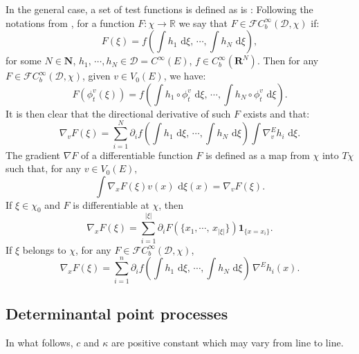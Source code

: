 \documentclass[11pt,a4paper]{amsart}
\begin{document}
In the general case, a set of test functions is defined as is :
Following the notations from \cite{MR99d:58179}, for a function
$F:\chi\rightarrow \mathbb{R}$ we say that $F \in
\mathcal{F}C^{\infty}_b(\mathcal{D},\chi)$ if:
\begin{equation*}
   F(\xi)=f\left(\int h_1 {\text{ d}}\xi,\, \cdots, \int h_N{\text{ d}}\xi  \right),
\end{equation*}
for some $N \in {{\mathbf N}}$, $h_1,\, \cdots,h_N \in
\mathcal{D}=C^{\infty}(E)$, $f \in C^{\infty}_b({{\mathbf R}}^N)$.  Then for any
$F \in \mathcal{F}C^{\infty}_b(\mathcal{D},\chi)$, given $v \in
V_0(E)$, we have:
\begin{equation*}
  F(\phi_t^v(\xi))=f\left(\int h_1 \circ \phi_t^v{\text{ d}}\xi,\, \cdots, \int h_N \circ \phi_t^v{\text{ d}}\xi\right).
\end{equation*}
It is then clear that the directional derivative of such $F$ exists
and that:
\begin{equation*}
  \nabla_v F(\xi)=\sum_{i=1}^N \partial_i f
  \left(\int h_1 {\text{ d}}\xi,\, \cdots, \int h_N{\text{ d}}\xi \right) \int \nabla^E_v h_i{\text{ d}} \xi.
\end{equation*}
The gradient $\nabla F$ of a differentiable function $F$ is defined as
a map from $\chi$ into $T\chi$ such that, for any $v\in V_0(E),$
\begin{equation*}
  \int \nabla_x F(\xi) v(x){\text{ d}}\xi(x)=\nabla_vF(\xi).
\end{equation*}
If $\xi\in \chi_0$ and $F$ is differentiable at $\chi$, then
\begin{equation*}
  \nabla_x F(\xi)=\sum_{i=1}^{|\xi|} \partial_i F(\{x_1,\cdots,\, x_{|\xi|}\}) {{\mathbf 1}}_{\{x=x_i\}}.
\end{equation*}
If $\xi$ belongs to $\chi$, for any $F \in
\mathcal{F}C^{\infty}_b(\mathcal{D},\chi)$,
\begin{equation*}
  \nabla_x F(\xi)=\sum_{i=1}^n \partial_i f  \left(\int h_1
    {\text{ d}}\xi,\, \cdots, \int h_N{\text{ d}}\xi \right)\, \nabla^E h_i(x).
\end{equation*}
\subsection{Determinantal point processes}
\label{sec:determ-point-proc}
In what follows, $c$ and $\kappa$ are positive constant which may vary
from line to line.
\end{document}

